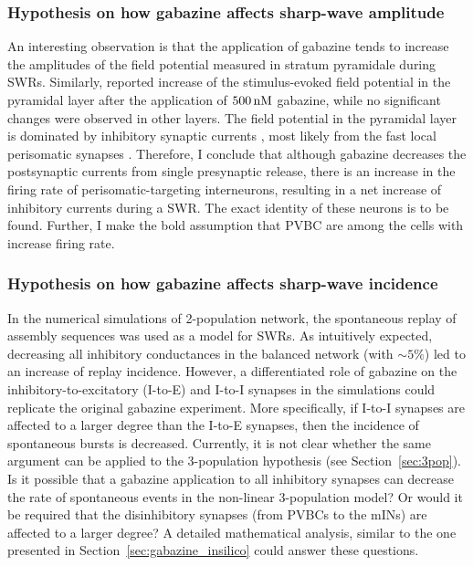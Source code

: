     \subsubsection{Hypothesis on how gabazine affects sharp-wave amplitude} 
      An interesting observation is that the application of gabazine tends to
      increase the amplitudes of the field potential measured in stratum
      pyramidale during SWRs. Similarly, \cite{Steidl2006} reported increase of
      the stimulus-evoked field potential in the pyramidal layer after the
      application of $500\,\rm nM$ gabazine, while no significant changes were
      observed in other layers. The field potential in the pyramidal layer is
      dominated by inhibitory synaptic currents \citep{Schonberger2014}, most
      likely from the fast local perisomatic synapses \citep{Ylinen1995}.
      Therefore, I conclude that although gabazine decreases the postsynaptic
      currents from single presynaptic release, there is an increase in the
      firing rate of perisomatic-targeting interneurons, resulting in a net
      increase of inhibitory currents during a SWR. The exact identity of these
      neurons is to be found. Further, I make the bold assumption that PVBC are
      among the cells with increase firing rate.

    \subsubsection{Hypothesis on how gabazine affects sharp-wave incidence} 
      In the numerical simulations of 2-population network, the spontaneous
      replay of assembly sequences was used as a model for SWRs. As intuitively
      expected, decreasing all inhibitory conductances in the balanced network
      (with $\sim 5 \%$) led to an increase of replay incidence.  However, a
      differentiated role of gabazine on the inhibitory-to-excitatory (I-to-E)
      and I-to-I synapses in the simulations could replicate the original
      gabazine experiment. More specifically, if I-to-I synapses are affected
      to a larger degree than the I-to-E synapses, then the incidence of
      spontaneous bursts is decreased. Currently, it is not clear whether the
      same argument can be applied to the 3-population hypothesis (see
      Section~\ref{sec:3pop}). Is it possible that a gabazine application to
      all inhibitory synapses can decrease the rate of spontaneous events in
      the non-linear 3-population model? Or would it be required that the
      disinhibitory synapses (from PVBCs to the mINs) are affected to a larger
      degree? A detailed mathematical analysis, similar to the one presented in
      Section~\ref{sec:gabazine_insilico} could answer these questions.

